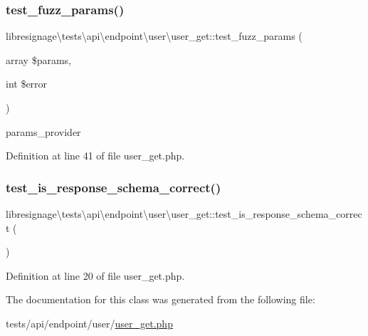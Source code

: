 \subsubsection{\texorpdfstring{test\+\_\+fuzz\+\_\+params()}{test\_fuzz\_params()}}
{\footnotesize\ttfamily libresignage\textbackslash{}tests\textbackslash{}api\textbackslash{}endpoint\textbackslash{}user\textbackslash{}user\+\_\+get\+::test\+\_\+fuzz\+\_\+params (\begin{DoxyParamCaption}\item[{array}]{\$params,  }\item[{int}]{\$error }\end{DoxyParamCaption})}

params\+\_\+provider 

Definition at line 41 of file user\+\_\+get.\+php.

\mbox{\label{classlibresignage_1_1tests_1_1api_1_1endpoint_1_1user_1_1user__get_a94140f25b804eea3061deb0ceca57f2f}} 
\subsubsection{\texorpdfstring{test\+\_\+is\+\_\+response\+\_\+schema\+\_\+correct()}{test\_is\_response\_schema\_correct()}}
{\footnotesize\ttfamily libresignage\textbackslash{}tests\textbackslash{}api\textbackslash{}endpoint\textbackslash{}user\textbackslash{}user\+\_\+get\+::test\+\_\+is\+\_\+response\+\_\+schema\+\_\+correct (\begin{DoxyParamCaption}{ }\end{DoxyParamCaption})}



Definition at line 20 of file user\+\_\+get.\+php.



The documentation for this class was generated from the following file\+:\begin{DoxyCompactItemize}
\item 
tests/api/endpoint/user/\hyperlink{tests_2api_2endpoint_2user_2user__get_8php}{user\+\_\+get.\+php}\end{DoxyCompactItemize}
